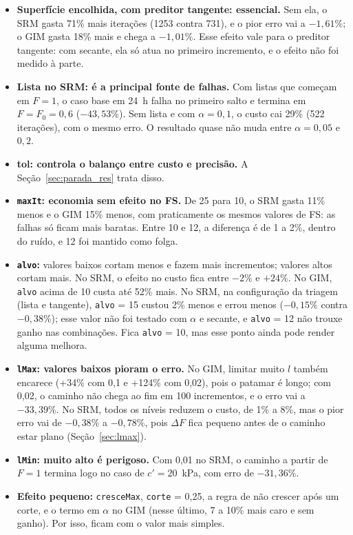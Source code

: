 \documentclass[11pt,a4paper]{article}
\numberwithin{equation}{section}
\begin{document}
\begin{itemize}
\item \textbf{Superfície encolhida, com preditor tangente: essencial.} Sem ela, o SRM gasta 71\% mais iterações (1253 contra 731), e o pior erro vai a $-1{,}61\%$; o GIM gasta 18\% mais e chega a $-1{,}01\%$. Esse efeito vale para o preditor tangente: com secante, ela só atua no primeiro incremento, e o efeito não foi medido à parte.
\item \textbf{Lista no SRM: é a principal fonte de falhas.} Com listas que começam em $F = 1$, o caso base em 24~h falha no primeiro salto e termina em $F = F_0 = 0{,}6$ ($-43{,}53\%$). Sem lista e com $\alpha = 0{,}1$, o custo cai 29\% (522 iterações), com o mesmo erro. O resultado quase não muda entre $\alpha = 0{,}05$ e $0{,}2$.
\item \textbf{tol: controla o balanço entre custo e precisão.} A Seção~\ref{sec:parada_res} trata disso.
\item \textbf{\texttt{maxIt}: economia sem efeito no FS.} De 25 para 10, o SRM gasta 11\% menos e o GIM 15\% menos, com praticamente os mesmos valores de FS: as falhas só ficam mais baratas. Entre 10 e 12, a diferença é de 1 a 2\%, dentro do ruído, e 12 foi mantido como folga.
\item \textbf{\texttt{alvo}:} valores baixos cortam menos e fazem mais incrementos; valores altos cortam mais. No SRM, o efeito no custo fica entre $-2\%$ e $+24\%$. No GIM, \texttt{alvo} acima de 10 custa até 52\% mais. No SRM, na configuração da triagem (lista e tangente), \texttt{alvo} = 15 custou 2\% menos e errou menos ($-0{,}15\%$ contra $-0{,}38\%$); esse valor não foi testado com $\alpha$ e secante, e \texttt{alvo} = 12 não trouxe ganho nas combinações. Fica \texttt{alvo} = 10, mas esse ponto ainda pode render alguma melhora.
\item \textbf{\texttt{lMax}: valores baixos pioram o erro.} No GIM, limitar muito $l$ também encarece (+34\% com 0,1 e +124\% com 0,02), pois o patamar é longo; com 0,02, o caminho não chega ao fim em 100 incrementos, e o erro vai a $-33{,}39\%$. No SRM, todos os níveis reduzem o custo, de 1\% a 8\%, mas o pior erro vai de $-0{,}38\%$ a $-0{,}78\%$, pois $\Delta F$ fica pequeno antes de o caminho estar plano (Seção~\ref{sec:lmax}).
\item \textbf{\texttt{lMin}: muito alto é perigoso.} Com 0,01 no SRM, o caminho a partir de $F = 1$ termina logo no caso de $c' = 20$~kPa, com erro de $-31{,}36\%$.
\item \textbf{Efeito pequeno:} \texttt{cresceMax}, \texttt{corte} = 0,25, a regra de não crescer após um corte, e o termo em $\alpha$ no GIM (nesse último, 7 a 10\% mais caro e sem ganho). Por isso, ficam com o valor mais simples.
\end{itemize}
\end{document}
